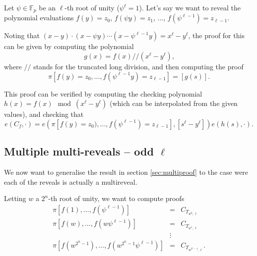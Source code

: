 \documentclass[a4paper]{article}
\begin{document}
Let $\psi\in\mathbb{F}_p$ be an $\ell$-th root of unity ($\psi^\ell=1$). Let's say we want to reveal the polynomial evaluations $f(y) = z_0$, $f(\psi y) = z_1$, $\ldots$, $f(\psi^{\ell-1})=z_{\ell - 1}$.

Noting that $(x-y)\cdot(x-\psi y) \cdots (x - \psi^{\ell-1} y) = x^\ell - y^\ell$, the proof for this can be given by computing the polynomial
\begin{equation}
g(x) = f(x) // (x^\ell - y^\ell)\text{,}
\end{equation}
where $//$ stands for the truncated long division, and then computing the proof
\begin{equation}
     \pi[f(y) = z_0, \ldots, f(\psi^{\ell-1}y)=z_{\ell - 1}] = [g(s)] \text{.}
\end{equation}

This proof can be verified by computing the checking polynomial $h(x) = f(x) \mod (x^\ell - y^\ell)$ (which can be interpolated from the given values), and checking that
\begin{equation}
e(C_f, \cdot) = e(\pi[f(y) = z_0), \ldots, f(\psi^{\ell-1})=z_{\ell - 1}], [s^\ell - y^\ell]) e(h(s),\cdot) \text{.}
\end{equation}

\subsection{Multiple multi-reveals -- odd $\ell$}

We now want to generalise the result in section \ref{sec:multiproof} to the case were each of the reveals is actually a multireveal.

Letting $w$ a $2^n$-th root of unity, we want to compute proofs
\begin{eqnarray}
     \pi[f(1), \ldots, f(\psi^{\ell-1})] &=& C_{T_{w^0, \ell}} \\
     \pi[f(w), \ldots, f(w\psi^{\ell-1})] &=& C_{T_{w^1, \ell}} \\
     &\vdots& \nonumber \\
     \pi[f(w^{2^n-1}), \ldots, f(w^{2^n-1}\psi^{\ell-1})] &=& C_{T_{w^{2^n-1}, \ell}} \text{.}
\end{eqnarray}
\end{document}
